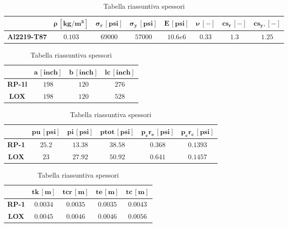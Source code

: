 \begin{table}[H]

\centering
\begin{tabular}{|c|c|c|c|c|c|c|c|}
\hline
& $\bm{\rho \, [kg/m^3]}$ & $\bm{\sigma_{r} \, [psi]}$ & $\bm{\sigma_{y} \, [psi]}$ & $\bm{E \, [psi]}$ & $\bm{\nu\, [-]}$& $\bm{cs_r \, [-]}$ & $\bm{cs_y, [-]}$ \\
\hline
\textbf{Al2219-T87} & $0.103$ & $69000$ & $57000$ & $10.6e6$ & $0.33$ & $1.3$ & $1.25$ \\
\hline
\end{tabular}

\caption{Lega Alluminio 2219-T9}
\label{table:dati_materiale}

\vspace{5pt}

\begin{tabular}{|c|c|c|c|}
\hline
& $\bm{a \, [inch]}$ & $\bm{b \, [inch]}$ & $\bm{lc \, [inch]}$ \\
\hline
\textbf{RP-1l} & $198$ & $120$ & $276$ \\
\hline
\textbf{LOX} & $198$ & $120$ & $528$ \\
\hline
\end{tabular}


\caption{Dati geometrici}
\label{table:dati_geometrici}

\vspace{5pt}

\begin{tabular}{|c|c|c|c|c|c|}
\hline
& $\bm{pu \, [psi]}$ & $\bm{pi \, [psi]}$ & $\bm{ptot \, [psi]}$ & $\bm{p_cr_e \, [psi]}$ & $\bm{p_cr_c \, [psi]}$\\
\hline
\textbf{RP-1} & $25.2$ & $13.38$ & $38.58$ & $0.368$ & $0.1393$\\
\hline
\textbf{LOX} & $23$ & $27.92$ & $50.92$ & $0.641$ & $0.1457$\\
\hline
\end{tabular}


\caption{Tabella riassuntiva pressioni}
\label{table:pressioni}

\vspace{5pt}

\begin{tabular}{|c|c|c|c|c|}
\hline
& $\bm{tk \, [m]}$ & $\bm{tcr \, [m]}$ & $\bm{te \, [m]}$ & $\bm{tc\, [m]}$\\
\hline
\textbf{RP-1} & $0.0034$ & $0.0035$ & $0.0035$ & $0.0043$\\
\hline
\textbf{LOX} & $0.0045$ & $0.0046$ & $0.0046$ & $0.0056$\\
\hline
\end{tabular}


\caption{Tabella riassuntiva spessori}
\label{table:spessori}


\end{table}



